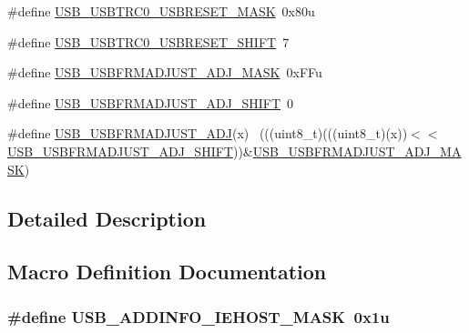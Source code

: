 \begin{DoxyCompactItemize}
\item 
\#define \hyperlink{group___u_s_b___register___masks_ga3b307f8358be6942775121b6a92243ab}{U\+S\+B\+\_\+\+U\+S\+B\+T\+R\+C0\+\_\+\+U\+S\+B\+R\+E\+S\+E\+T\+\_\+\+M\+A\+SK}~0x80u
\item 
\#define \hyperlink{group___u_s_b___register___masks_gab20fcb9276a34cbbd33ac0364c419f13}{U\+S\+B\+\_\+\+U\+S\+B\+T\+R\+C0\+\_\+\+U\+S\+B\+R\+E\+S\+E\+T\+\_\+\+S\+H\+I\+FT}~7
\item 
\#define \hyperlink{group___u_s_b___register___masks_ga3bbdc3dbdf46947a16a7b4429ad9a0c7}{U\+S\+B\+\_\+\+U\+S\+B\+F\+R\+M\+A\+D\+J\+U\+S\+T\+\_\+\+A\+D\+J\+\_\+\+M\+A\+SK}~0x\+F\+Fu
\item 
\#define \hyperlink{group___u_s_b___register___masks_ga81985f8c59f9aa0c0340a70136b55098}{U\+S\+B\+\_\+\+U\+S\+B\+F\+R\+M\+A\+D\+J\+U\+S\+T\+\_\+\+A\+D\+J\+\_\+\+S\+H\+I\+FT}~0
\item 
\#define \hyperlink{group___u_s_b___register___masks_gaf720ebb728601eb6b28984ed63b88b78}{U\+S\+B\+\_\+\+U\+S\+B\+F\+R\+M\+A\+D\+J\+U\+S\+T\+\_\+\+A\+DJ}(x)                                ~(((uint8\+\_\+t)(((uint8\+\_\+t)(x))$<$$<$\hyperlink{group___u_s_b___register___masks_ga81985f8c59f9aa0c0340a70136b55098}{U\+S\+B\+\_\+\+U\+S\+B\+F\+R\+M\+A\+D\+J\+U\+S\+T\+\_\+\+A\+D\+J\+\_\+\+S\+H\+I\+FT}))\&\hyperlink{group___u_s_b___register___masks_ga3bbdc3dbdf46947a16a7b4429ad9a0c7}{U\+S\+B\+\_\+\+U\+S\+B\+F\+R\+M\+A\+D\+J\+U\+S\+T\+\_\+\+A\+D\+J\+\_\+\+M\+A\+SK})
\end{DoxyCompactItemize}


\subsection{Detailed Description}


\subsection{Macro Definition Documentation}
\subsubsection[{\texorpdfstring{U\+S\+B\+\_\+\+A\+D\+D\+I\+N\+F\+O\+\_\+\+I\+E\+H\+O\+S\+T\+\_\+\+M\+A\+SK}{USB_ADDINFO_IEHOST_MASK}}]{\setlength{\rightskip}{0pt plus 5cm}\#define U\+S\+B\+\_\+\+A\+D\+D\+I\+N\+F\+O\+\_\+\+I\+E\+H\+O\+S\+T\+\_\+\+M\+A\+SK~0x1u}\hypertarget{group___u_s_b___register___masks_gacb7c792034c73c4861bc8fba6ff4314f}{}\label{group___u_s_b___register___masks_gacb7c792034c73c4861bc8fba6ff4314f}


